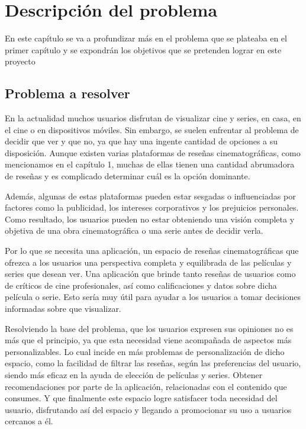\chapter{Descripción del problema}

En este capítulo se va a profundizar más en el problema que se plateaba en el primer capítulo y se 
expondrán los objetivos que se pretenden lograr en este proyecto

\section{Problema a resolver}

En la actualidad muchos usuarios disfrutan de visualizar cine y series, en casa, en el cine o en 
dispositivos móviles. Sin embargo, se suelen enfrentar al problema de decidir que ver y que no, ya que 
hay una ingente cantidad de opciones a su disposición. Aunque existen varias plataformas de reseñas 
cinematográficas, como mencionamos en el capítulo 1, muchas de ellas tienen una cantidad abrumadora de 
reseñas y es complicado determinar cuál es la opción dominante.

Además, algunas de estas plataformas pueden estar sesgadas o influenciadas por factores como la 
publicidad, los intereses corporativos y los prejuicios personales. Como resultado, los usuarios pueden 
no estar obteniendo una visión completa y objetiva de una obra cinematográfica o una serie antes de 
decidir verla.

Por lo que se necesita una aplicación, un espacio de reseñas cinematográficas que ofrezca a los 
usuarios una perspectiva completa y equilibrada de las películas y series que desean ver. Una 
aplicación que brinde tanto reseñas de usuarios como de críticos de cine profesionales, así como 
calificaciones y datos sobre dicha película o serie. Esto sería muy útil para ayudar a los usuarios a 
tomar decisiones informadas sobre que visualizar.

Resolviendo la base del problema, que los usuarios expresen sus opiniones no es más que el principio, 
ya que esta necesidad viene acompañada de aspectos más personalizables. Lo cual incide en más problemas 
de personalización de dicho espacio, como la facilidad de filtrar las reseñas, según las preferencias 
del usuario, siendo más eficaz en la ayuda de elección de películas y series. Obtener recomendaciones 
por parte de la aplicación, relacionadas con el contenido que consumes. Y que finalmente este espacio 
logre satisfacer toda necesidad del usuario, disfrutando así del espacio y llegando a promocionar su 
uso a usuarios cercanos a él.

